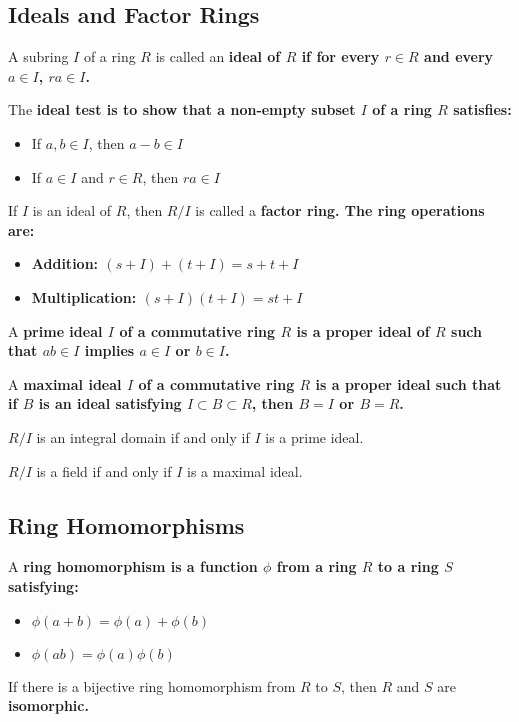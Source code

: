 \documentclass{hmwk}
\begin{document}
\subsection{Ideals and Factor Rings}
\begin{defn}
A subring $I$ of a ring $R$ is called an \bf{ideal} of $R$ if for every $r \in R$ and every $a \in I$, $ra \in I$.
\end{defn}

\begin{prop}
The \bf{ideal test} is to show that a non-empty subset $I$ of a ring $R$ satisfies:
\begin{itemize}
    \item If $a, b \in I$, then $a - b \in I$
    \item If $a \in I$ and $r \in R$, then $ra \in I$
\end{itemize}
\end{prop}

\begin{defn}
If $I$ is an ideal of $R$, then $R/I$ is called a \bf{factor ring}. The ring operations are:
\begin{itemize}
    \item \bf{Addition:} $(s + I) + (t + I) = s + t + I$
    \item \bf{Multiplication:} $(s + I)(t + I) = st + I$
\end{itemize}
\end{defn}

\begin{defn}
A \bf{prime ideal} $I$ of a commutative ring $R$ is a proper ideal of $R$ such that $ab \in I$ implies $a \in I$ or $b \in I$.
\end{defn}

\begin{defn}
A \bf{maximal ideal} $I$ of a commutative ring $R$ is a proper ideal such that if $B$ is an ideal satisfying $I \subset B \subset R$, then $B = I$ or $B = R$.
\end{defn}

\begin{prop}
$R/I$ is an integral domain if and only if $I$ is a prime ideal. 
\end{prop}

\begin{prop}
$R/I$ is a field if and only if $I$ is a maximal ideal.
\end{prop}

\subsection{Ring Homomorphisms}
\begin{defn}
A \bf{ring homomorphism} is a function $\phi$ from a ring $R$ to a ring $S$ satisfying:
\begin{itemize}
    \item $\phi(a + b) = \phi(a) + \phi(b)$
    \item $\phi(ab) = \phi(a)\phi(b)$
\end{itemize}

If there is a bijective ring homomorphism from $R$ to $S$, then $R$ and $S$ are \bf{isomorphic}.
\end{defn}
\end{document}
